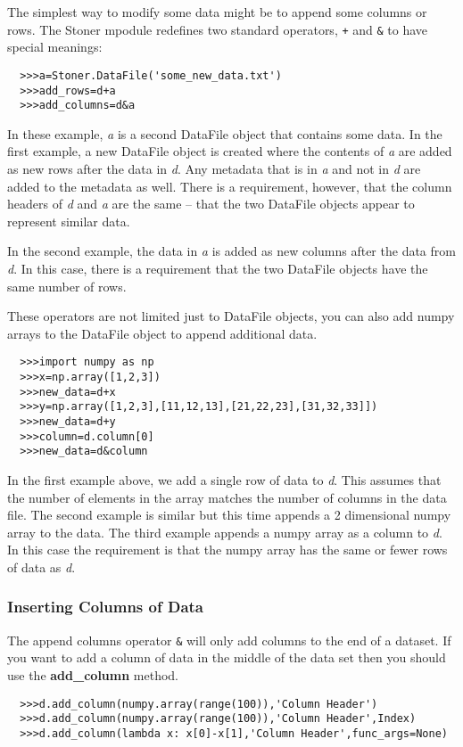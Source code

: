 \documentclass[a4paper,11pt]{scrartcl}
\begin{document}
The simplest way to modify some data might be to append some columns or rows. The Stoner mpodule redefines two standard operators, \verb:+: and \verb:&: to have special meanings:
\begin{verbatim}
  >>>a=Stoner.DataFile('some_new_data.txt')
  >>>add_rows=d+a
  >>>add_columns=d&a
\end{verbatim}
In these example, \textit{a} is a second DataFile object that contains some data. In the first example, a new DataFile object is created where the contents of \textit{a} are added as new rows after the data in \textit{d}. Any metadata that is in \textit{a} and not in \textit{d} are added to the metadata as well. There is a requirement, however, that the column headers of \textit{d} and \textit{a} are the same -- \ie that the two DataFile objects appear to represent similar data.

In the second example, the data in \textit{a} is added as new columns after the data from \textit{d}. In this case, there is a requirement that the two DataFile objects have the same number of rows.

These operators are not limited just to DataFile objects, you can also add numpy arrays to the DataFile object to append additional data.
\begin{verbatim}
  >>>import numpy as np
  >>>x=np.array([1,2,3])
  >>>new_data=d+x
  >>>y=np.array([1,2,3],[11,12,13],[21,22,23],[31,32,33]])
  >>>new_data=d+y
  >>>column=d.column[0]
  >>>new_data=d&column
\end{verbatim}
In the first example above, we add a single row of data to \textit{d}. This assumes that the number of elements in the array matches the number of columns in the data file. The second example is similar but this time appends a 2 dimensional numpy array to the data. The third example appends a numpy array as a column to \textit{d}. In this case the requirement is that the numpy array has the same or fewer rows of data as \textit{d}.

\subsubsection{Inserting Columns of Data}

The append columns operator \verb#&# will only add columns to the end of a dataset. If you want to add a column of data in the middle of the data set then you should use the \textbf{add\_column} method.

\begin{verbatim}
  >>>d.add_column(numpy.array(range(100)),'Column Header')
  >>>d.add_column(numpy.array(range(100)),'Column Header',Index)
  >>>d.add_column(lambda x: x[0]-x[1],'Column Header',func_args=None)
\end{verbatim}
\end{document}
